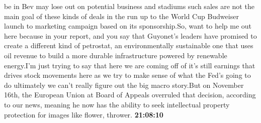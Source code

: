 \documentclass{article}%
\begin{document}
be in Bev may lose out on potential business and stadiums such sales are not the main goal of these kinds of deals in the run up to the World Cup Budweiser launch to marketing campaign based on its sponsorship.So, want to help me out here because in your report, and you say that Guyonet's leaders have promised to create a different kind of petrostat, an environmentally sustainable one that uses oil revenue to build a more durable infrastructure powered by renewable energy.I'm just trying to say that here we are coming off of it's still earnings that drives stock movements here as we try to make sense of what the Fed's going to do ultimately we can't really figure out the big macro story.But on November 16th, the European Union at Board of Appeals overruled that decision, according to our news, meaning he now has the ability to seek intellectual property protection for images like flower, thrower.%
\textbf{21:08:10}%
\newline%
\end{document}
